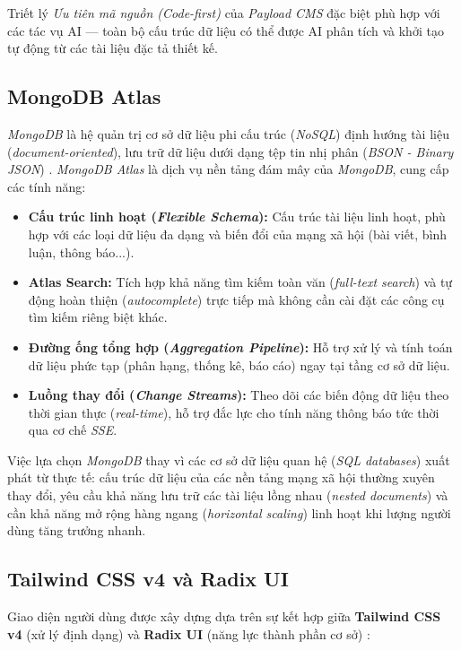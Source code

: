 \documentclass[13pt,a4paper,oneside]{extreport}
\numberwithin{equation}{chapter}
\numberwithin{figure}{chapter}
\numberwithin{table}{chapter}
\begin{document}
Triết lý \textit{Ưu tiên mã nguồn (Code-first)} của \textit{Payload CMS} đặc biệt phù hợp với các tác vụ AI — toàn bộ cấu trúc dữ liệu có thể được AI phân tích và khởi tạo tự động từ các tài liệu đặc tả thiết kế.

\subsection{MongoDB Atlas}

\textit{MongoDB} là hệ quản trị cơ sở dữ liệu phi cấu trúc (\textit{NoSQL}) định hướng tài liệu (\textit{document-oriented}), lưu trữ dữ liệu dưới dạng tệp tin nhị phân (\textit{BSON - Binary JSON}) \cite{ref-atlas}. \textit{MongoDB Atlas} là dịch vụ nền tảng đám mây của \textit{MongoDB}, cung cấp các tính năng:

\begin{itemize}
    \item \textbf{Cấu trúc linh hoạt (\textit{Flexible Schema}):} Cấu trúc tài liệu linh hoạt, phù hợp với các loại dữ liệu đa dạng và biến đổi của mạng xã hội (bài viết, bình luận, thông báo...).
    \item \textbf{Atlas Search:} Tích hợp khả năng tìm kiếm toàn văn (\textit{full-text search}) và tự động hoàn thiện (\textit{autocomplete}) trực tiếp mà không cần cài đặt các công cụ tìm kiếm riêng biệt khác.
    \item \textbf{Đường ống tổng hợp (\textit{Aggregation Pipeline}):} Hỗ trợ xử lý và tính toán dữ liệu phức tạp (phân hạng, thống kê, báo cáo) ngay tại tầng cơ sở dữ liệu.
    \item \textbf{Luồng thay đổi (\textit{Change Streams}):} Theo dõi các biến động dữ liệu theo thời gian thực (\textit{real-time}), hỗ trợ đắc lực cho tính năng thông báo tức thời qua cơ chế \textit{SSE}.
\end{itemize}

Việc lựa chọn \textit{MongoDB} thay vì các cơ sở dữ liệu quan hệ (\textit{SQL databases}) xuất phát từ thực tế: cấu trúc dữ liệu của các nền tảng mạng xã hội thường xuyên thay đổi, yêu cầu khả năng lưu trữ các tài liệu lồng nhau (\textit{nested documents}) và cần khả năng mở rộng hàng ngang (\textit{horizontal scaling}) linh hoạt khi lượng người dùng tăng trưởng nhanh.

\subsection{Tailwind CSS v4 và Radix UI}

Giao diện người dùng được xây dựng dựa trên sự kết hợp giữa \textbf{Tailwind CSS v4} (xử lý định dạng) và \textbf{Radix UI} (năng lực thành phần cơ sở) \cite{ref-radix}:
\end{document}
